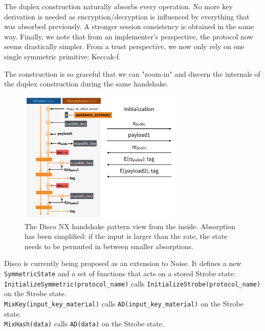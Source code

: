 \documentclass{article}
\begin{document}
The duplex construction naturally absorbs every operation. No more key derivation is needed as encryption/decryption is influenced by everything that was absorbed previously. A stronger session consistency is obtained in the same way. Finally, we note that from an implementer's perspective, the protocol now seems drastically simpler. From a trust perspective, we now only rely on one single symmetric primitive: Keccak-f. 

The construction is so graceful that we can "zoom-in" and discern the internals of the duplex construction during the same handshake.

\begin{figure}[H]
\centering
\includegraphics[width=0.7\textwidth]{rwcimg/duplex_view.png}
\caption{The Disco NX handshake pattern view from the inside. Absorption has been simplified: if the input is larger than the rate, the state needs to be permuted in between smaller absorptions.}
\end{figure}

Disco is currently being proposed as an extension to Noise\cite{disco}. It defines a new \texttt{SymmetricState} and a set of functions that acts on a stored Strobe state:\\

\texttt{InitializeSymmetric(protocol_name)} calls \texttt{InitializeStrobe(protocol_name)} on the Strobe state.\\

\texttt{MixKey(input_key_material)} calls \texttt{AD(input_key_material)} on the Strobe state.\\

\texttt{MixHash(data)} calls \texttt{AD(data)} on the Strobe state.\\
\end{document}
